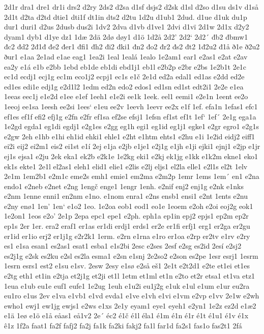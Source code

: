 2d1r
dra1
dre1
dr1i
drs2
d2ry
2ds2
d2sa
d1sf
dsjs2
d2sk
d1sl
d2so
d1su
ds1v
d1så
2d1t
d2ta
d2td
dtie1
dti1f
dt1in
dts2
d2tu
1d2u
d1ub1
2dud.
d1ue
d1uk
du1p
dur1
duri1
d2us
2dusb
dus2i
1dv2
2dva
d1vb
d1ve1
2dvi
d1vï
2d1w
2d1x
d2y2
dyam1
dyb1
d1ye
dz1
1dæ
2dä
2dø
døy1
d1ö
1d2å
2d2'
2d2`
2d2´
đb2
đbmw1
đc2
đd2
2đ1đ
đe2
đer1
đfi1
đh2
đi2
đki1
đn2
đo2
đr2
đs2
đt2
1đ2u2
đ1å
ð1e
ð2u2
ður1
e1aa
2e1ad
e1ae
eag1
1ea2i
1eal
1ealá
1ealo
1e2am1
ear1
e2as1
e2at
e2av
ea2y
e1á
e1b
e2bb
1ebd
eb1de
eb1di
ebd1j1
eb1l
e2b2p
e2br
e2bs
1e2b1t
2e1c
ec1d
ecdj1
ecj1g
ec1m
eco1j2
ecpj1
ec1s
e1č
2e1d
ed2a
edal1
ed1as
e2dd
ed2e
ed1es
edi1e
edj1g
e2d1l2
1edm
ed2n
edo2
edos1
ed1sn
ed1st
edt2i1
2e2e
e1ea
1eeas
eec1j
e1e2d
e1ee
e1ef
1eeh1
e1e2i
ee1k
1eek.
eel1
eemi1
e2e1n
1eent
ee2o
1eeoj
ee1sa
1eesh
ee2si
1ees`
e1eu
ee2v
1eevh
1eevr
ee2x
e1f
1ef.
efa1n
1efas1
efc1
ef1es
ef1f
efi2
efj1g
e2fn
e2fr
ef1sa
ef2se
efsj1
1efsn
ef1st
ef1t
1ef`
1ef´
2e1g
ega1a
1e2gd
egda1
eg1di
egdj1
e2g1es
e2gg
eg1h
egi1
eg1id
eg1j1
egke1
e2gr
egro1
e2g1s
e2gw
2eh
e1hb
e1hi
eh1id
ehki1
ehle1
e2ht
e1htm
ehts1
e2hu
e1i
1e2id
eidj2
eiff1
ei2i
eij2
ei2m1
eis2
ei1st
e1í
2ej
e1ja
e2jb
e1je1
e2j1g
e1jh
e1ji
ejki1
ejnj1
e2jp
e1jr
ej1s
ejsa1
e2ju
2ek
eka1
ek2b
e2k1e
1e2kg
eki1
e2kj
ek1jg
e1kk
e1k2m
ekne1
eko1
ek1s
ekte1
2e1l
el2as1
eleh1
elid1
elie1
e2lis
e2lj
eljs1
el2la
elle1
e2l1s
el2t
1elv
2e1m
1em2b1
e2m1c
eme2s
emh1
emie1
em2ma
e2m2p
1emr
1ems
1em´
en1
e2na
endo1
e2neb
e2net
e2ng
1engč
enge1
1engr
1enh.
e2nif
enj2
enj1g
e2nk
e1nks
e2nm
1enne
enni1
en2nm
e1no.
e1nom
enra1
e2ns
ensb1
ensi1
e2nt
1ents
e2nu
e2ny
enø1
1en'
1en`
e1o2
1eo.
1e2oa
eob1
eod1
eo1e
1eoem
e2oh
e2oi
eoj2g
eok1
1e2on1
1eos
e2o'
2e1p
2epa
epc1
epe1
e2ph.
eph1a
ep1in
epj2
epjs1
ep2m
ep2r
ep1s
2er
1er.
era2
eraf1
er1as
er1di
erdj1
erds1
er2e
er1fi
erfj1
erg1
er2ga
er2gu
er1id
er1io
erj2
er1j1g
e2r2k1
1erm.
e2rn
e1rna
e1ro
er1oa
e2rp
er2tv
e1rv
e2ry
es1
e1sa
esan1
es2as1
esat1
esba1
e1s2bi
2esc
e2ses
2esf
e2sg
es2id
2esí
e2sj2
es2j1g
e2sk
es2ku
e2sl
es2la
esma1
e2sn
e1snj
2e2so2
e2son
es2pe
1esr
esrj1
1esrm
1esrn
esrs1
est2
e1su
e1sv.
2esw
2esy
e1sø
e2så
eš1
2e1t
e2t2d1
e2te
et1ei
et1es
e2tg
eth1
et1in
e2tja
et2j1g
et2ji
et1l
1etm
et1ml
et1n
e2to
et2r
etsa1
et1va
etz1
1eua
e1ub
eu1e
euf1
eufe1
1e2ug
1euh
e1u2i
eu1j2g
e1uk
e1ul
e1um
e1ur
eu2ra
eu1ro
e1us
2ev
e1va
e1vb1
e1vd
evda1
e1ve
e1vh
e1vi
e1vm
e2vp
e1vv
2e1w
e2wh
ewho1
ewj1
ew1jg
ewjs1
e2ws
e1xs
2e1y
eyam1
eye1
eyeh1
e2yn1
1e2z
ez2d
e1æ2
e1ä
1eø
e1ö
e1å
eåas1
eå1v2
2e´
éc2
é1č
é1l
éla1
é1m
é1n
é1r
é1t
é1u1
é1v
é1x
ê1z
1f2a
faat1
fa2f
fafj2
fa2j
fa1k
fa2ki
fakj2
fa1l
far1d
fa2s1
fas1o
fas2t1
2fá
